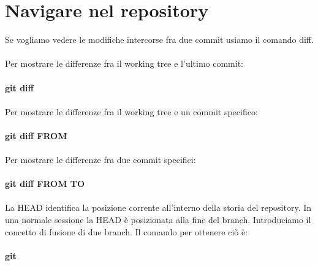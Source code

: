 \documentclass[a4paper,12pt]{report}
\begin{document}
\chapter{Navigare nel repository}
Se vogliamo vedere le modifiche intercorse fra due commit usiamo il comando diff.
\\\\
Per mostrare le differenze fra il working tree e l'ultimo commit:
\\\\
\textbf{git diff}
\\\\
Per mostrare le differenze fra il working tree e un commit specifico:
\\\\
\textbf{git diff FROM}
\\\\
Per mostrare le differenze fra due commit specifici:
\\\\
\textbf{git diff FROM TO}
\\\\
La HEAD identifica la posizione corrente all'interno della storia del repository. In una normale sessione la HEAD è posizionata alla fine del branch.
Introduciamo il concetto di fusione di due branch. Il comando per ottenere ciò è:
\\\\
\textbf{git }
\end{document}
